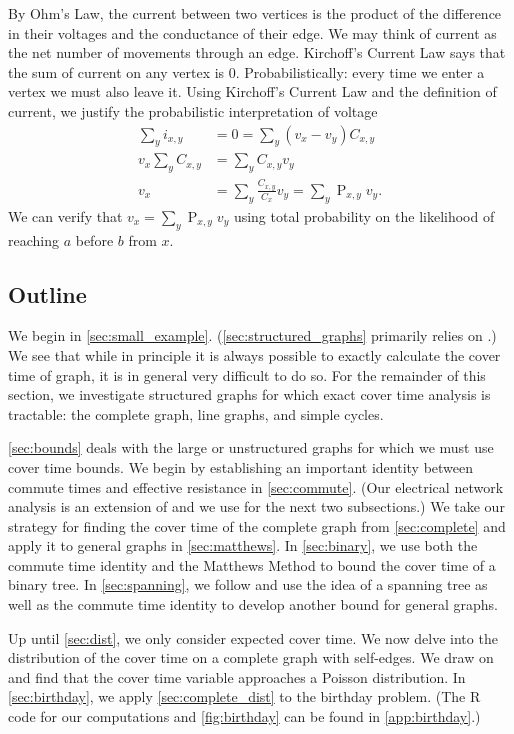 \documentclass[12pt]{article}
\theoremstyle{definition}
\DeclareMathOperator{\pr}{\mathrm{P}}		     %
\begin{document}
By Ohm's Law, the current between two vertices is the product of the
difference in their voltages and the conductance of their edge.
We may think of current as the net number of movements through an edge.
Kirchoff's Current Law says that the sum of current on any vertex is 0.
Probabilistically: every time we enter a vertex we must also leave it.
Using Kirchoff's Current Law and the definition of current,
we justify the probabilistic interpretation of voltage
\begin{align}
\sum_y i_{x,y} &= 0 = \sum_y (v_x - v_y)C_{x,y} \nonumber \\
v_x \sum_y C_{x,y} &= \sum_y C_{x,y} v_y \nonumber \\
v_x &= \sum_y \frac{C_{x,y}}{C_x} v_y = \sum_y \pr_{x,y} v_y. \nonumber
\end{align}
We can verify that $v_x = \sum_y \pr_{x,y} v_y$
using total probability on the likelihood of reaching $a$ before $b$ from $x$.

\subsection{Outline}

We begin in \cref{sec:small_example}.
(\cref{sec:structured_graphs} primarily relies on \cite{BH94}.)
We see that while in principle it is always possible to exactly 
calculate the cover time
of graph, it is in general very difficult to do so.
For the remainder of this section, we investigate
structured graphs for which exact cover time analysis is tractable:
the complete graph, line graphs, and simple cycles.

\cref{sec:bounds} deals with the large or unstructured graphs 
for which we must use cover time bounds.
We begin by establishing an important identity between
commute times and effective resistance in \cref{sec:commute}.
(Our electrical network analysis is an extension of \cite{DS84}
and we use \cite{LP17} for the next two subsections.)
We take our strategy for finding the cover time of the complete graph
from \cref{sec:complete} and apply it to general graphs in \cref{sec:matthews}.
In \cref{sec:binary}, we use both the commute time identity and the Matthews Method
to bound the cover time of a binary tree.
In \cref{sec:spanning}, we follow \cite{AF14} and use the idea of a spanning tree
as well as the commute time identity to develop another bound for general graphs.

Up until \cref{sec:dist}, we only consider expected cover time.
We now delve into the distribution of the cover time on a complete graph with self-edges.
We draw on \cite{Du11} and find that the cover time variable approaches a Poisson
distribution.
In \cref{sec:birthday}, we apply \cref{sec:complete_dist} to the birthday problem.
(The R code for our computations and \cref{fig:birthday} can be found in \cref{app:birthday}.)
\end{document}
